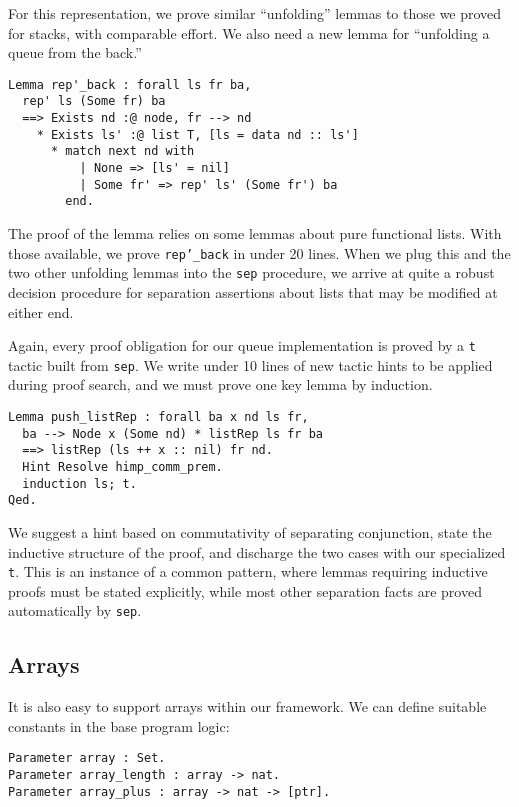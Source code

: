 \documentclass[preprint,nocopyrightspace]{sigplanconf}
\newcommand{\cd}[1]{\texttt{#1}}
\begin{document}
For this representation, we prove similar ``unfolding'' lemmas to those we proved for stacks, with comparable effort.  We also need a new lemma for ``unfolding a queue from the back.''

\begin{verbatim}
Lemma rep'_back : forall ls fr ba,
  rep' ls (Some fr) ba
  ==> Exists nd :@ node, fr --> nd
    * Exists ls' :@ list T, [ls = data nd :: ls']
      * match next nd with
          | None => [ls' = nil]
          | Some fr' => rep' ls' (Some fr') ba
        end.
\end{verbatim}

The proof of the lemma relies on some lemmas about pure functional lists.  With those available, we prove \cd{rep'\_back} in under 20 lines.  When we plug this and the two other unfolding lemmas into the \cd{sep} procedure, we arrive at quite a robust decision procedure for separation assertions about lists that may be modified at either end.

Again, every proof obligation for our queue implementation is proved by a \cd{t} tactic built from \cd{sep}.  We write under 10 lines of new tactic hints to be applied during proof search, and we must prove one key lemma by induction.

\begin{verbatim}
Lemma push_listRep : forall ba x nd ls fr,
  ba --> Node x (Some nd) * listRep ls fr ba
  ==> listRep (ls ++ x :: nil) fr nd.
  Hint Resolve himp_comm_prem.
  induction ls; t.
Qed.
\end{verbatim}

We suggest a hint based on commutativity of separating conjunction, state the inductive structure of the proof, and discharge the two cases with our specialized \cd{t}.  This is an instance of a common pattern, where lemmas requiring inductive proofs must be stated explicitly, while most other separation facts are proved automatically by \cd{sep}.


\subsection{Arrays}

It is also easy to support arrays within our framework.  We can define suitable constants in the base program logic:

\begin{verbatim}
Parameter array : Set.
Parameter array_length : array -> nat.  
Parameter array_plus : array -> nat -> [ptr].
\end{verbatim}
\end{document}
